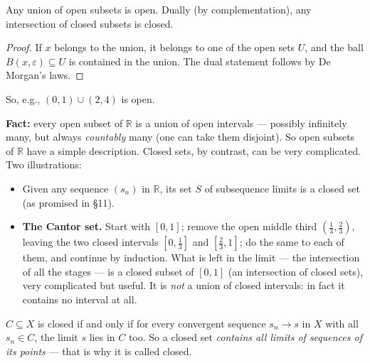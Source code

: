 \documentclass[11pt]{report}
\begin{document}
\begin{propbox}
Any union of open subsets is open. Dually (by complementation), any intersection of closed subsets is closed.
\end{propbox}

\begin{proof}
If $x$ belongs to the union, it belongs to one of the open sets $U$, and the ball $B(x,\varepsilon) \subseteq U$ is contained in the union. The dual statement follows by De Morgan's laws.
\end{proof}

So, e.g., $(0,1) \cup (2,4)$ is open.

\begin{rembox}
\textbf{Fact:} every open subset of $\mathbb{R}$ is a union of open intervals --- possibly infinitely many, but always \emph{countably} many (one can take them disjoint). So open subsets of $\mathbb{R}$ have a simple description. Closed sets, by contrast, can be very complicated. Two illustrations:
\begin{itemize}
    \item Given any sequence $(s_n)$ in $\mathbb{R}$, its set $S$ of subsequence limits is a closed set (as promised in \S 11).
    \item \textbf{The Cantor set.} Start with $[0,1]$; remove the open middle third $(\tfrac13, \tfrac23)$, leaving the two closed intervals $[0,\tfrac13]$ and $[\tfrac23, 1]$; do the same to each of them, and continue by induction. What is left in the limit --- the intersection of all the stages --- is a closed subset of $[0,1]$ (an intersection of closed sets), very complicated but useful. It is \emph{not} a union of closed intervals: in fact it contains no interval at all.
\end{itemize}
\end{rembox}

\begin{propbox}
$C \subseteq X$ is closed if and only if for every convergent sequence $s_n \to s$ in $X$ with all $s_n \in C$, the limit $s$ lies in $C$ too. So a closed set \emph{contains all limits of sequences of its points} --- that is why it is called closed.
\end{propbox}
\end{document}
